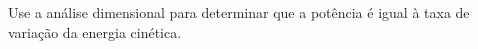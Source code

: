 Use a análise dimensional para determinar que a potência é igual à taxa de variação da energia cinética.


